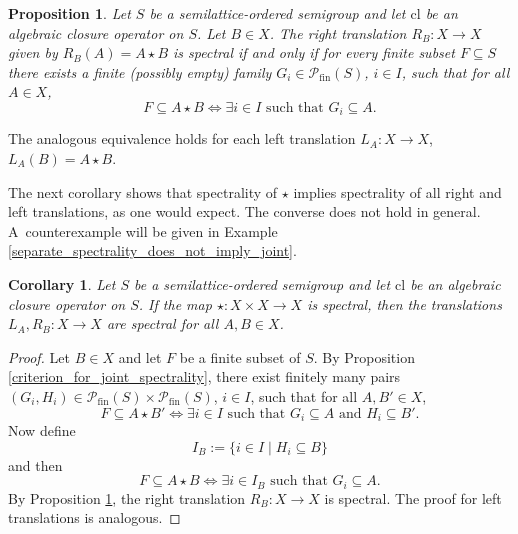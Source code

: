 \documentclass[10pt, reqno]{amsart}
\theoremstyle{plain}
\newtheorem{prop}[theorem]{Proposition}
\newtheorem{corollary}[theorem]{Corollary}
\theoremstyle{definition}
\begin{document}
\begin{prop}\label{criterion_for_separate_spectrality}
    Let $S$ be a semilattice-ordered semigroup and let $\mathrm{cl}$ be an algebraic closure operator on $S$. Let $B\in X$. The right translation $R_B : X \rightarrow X$ given by $R_B(A) = A \star B$ is spectral if and only if for every finite subset $F \subseteq S$ there exists a finite (possibly empty) family $G_i\in\mathcal{P}_\mathrm{fin}(S)$, $i\in I$,
    such that for all $A \in X$, 
    \begin{equation*}
        F \subseteq A \star B \iff \exists i\in I \text{ such that } G_i\subseteq A. 
    \end{equation*}
\end{prop}
\noindent The analogous equivalence holds for each left translation $L_A : X \rightarrow X$, $L_A(B) = A \star B$. 

The next corollary shows that spectrality of $\star$ implies spectrality of all right and left translations, as one would expect. The converse does not hold in general. A~counterexample will be given in Example \ref{separate_spectrality_does_not_imply_joint}.
\begin{corollary}\label{spectrality_of_star_implies_spectrality_of_all_translations}
    Let $S$ be a semilattice-ordered semigroup and let $\mathrm{cl}$ be an algebraic closure operator on $S$. If the map $\star : X \times X \rightarrow X$ is spectral, then the translations $L_A, R_B : X \rightarrow X$ are spectral for all $A, B \in X$. 
\end{corollary}
\begin{proof}
        Let $B \in X$ and let $F$ be a finite subset of $S$. By Proposition \ref{criterion_for_joint_spectrality}, there exist finitely many pairs $(G_i, H_i)\in\mathcal{P}_\mathrm{fin}(S)\times\mathcal{P}_\mathrm{fin}(S)$, $i\in I$, such that for all $A, B' \in X$, $$F \subseteq A \star B' \iff \exists i\in I\text{ such that } G_i \subseteq A\text{ and } H_i\subseteq B'.$$ Now define $$I_B := \{i\in I \mid H_i \subseteq B\}$$ and then $$F \subseteq A \star B \iff \exists i\in I_B\text{ such that } G_i\subseteq A.$$ By Proposition \ref{criterion_for_separate_spectrality}, the right translation $R_B: X \to X$ is spectral. The proof for left translations is analogous. 
\end{proof}
\end{document}
